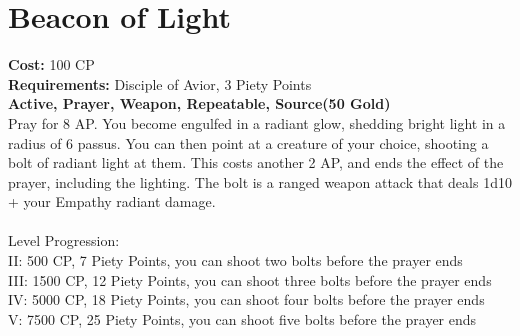\section{Beacon of Light}
\textbf{Cost:} 100 CP\\
\textbf{Requirements:} Disciple of Avior, 3 Piety Points \\
\textbf{Active, Prayer, Weapon, Repeatable, Source(50 Gold)}\\
Pray for 8 AP. You become engulfed in a radiant glow, shedding bright light in a radius of 6 passus. You can then point at a creature of your choice, shooting a bolt of radiant light at them. This costs another 2 AP, and ends the effect of the prayer, including the lighting. The bolt is a ranged weapon attack that deals 1d10 + your Empathy radiant damage.\\
\\
Level Progression:\\
II: 500 CP, 7 Piety Points, you can shoot two bolts before the prayer ends\\
III: 1500 CP, 12 Piety Points, you can shoot three bolts before the prayer ends\\
IV: 5000 CP, 18 Piety Points, you can shoot four bolts before the prayer ends\\
V: 7500 CP, 25 Piety Points, you can shoot five bolts before the prayer ends\\